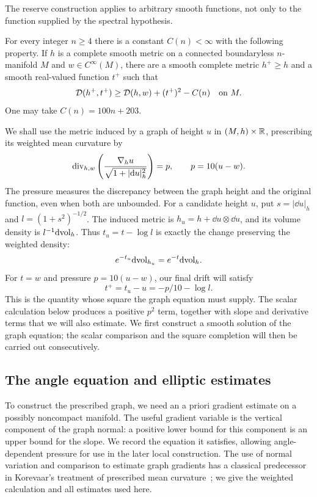The reserve construction applies to arbitrary smooth functions, not
only to the function supplied by the spectral hypothesis.

\begin{proposition}\label{pre:reserve}
For every integer $n\ge4$ there is a constant $C(n)<\infty$ with the
following property. If $h$ is a complete smooth metric on a connected
boundaryless $n$-manifold $M$ and $w\in C^\infty(M)$, there are a smooth
complete metric $h^+\ge h$ and a smooth real-valued function $t^+$ such that
\begin{equation}\label{pre:reserve-bound}
 \mathcal D(h^+,t^+)\ge \mathcal D(h,w)+(t^+)^2-C(n)
 \quad\hbox{on }M.
\end{equation}
One may take $C(n)=100n+203$.
\end{proposition}

We shall use the metric induced by a graph of height $u$ in
$(M,h)\times\mathbb R$, prescribing its weighted mean curvature by
\[
 \operatorname{div}_{h,w}\left(\frac{\nabla_hu}{\sqrt{1+|\mathrm d u|_h^2}}\right)
     =p,\qquad p=10(u-w).
\]
The pressure measures the discrepancy between the graph height and the
original function, even when both are unbounded.
For a candidate height $u$, put $s=|\dd u|_h$ and
$l=(1+s^2)^{-1/2}$. The induced metric is $h_u=h+\dd u\otimes\dd u$,
and its volume density is $l^{-1}\mathrm d\mathrm{vol}_h$. Thus $t_u=t-\log l$ is
exactly the change preserving the weighted density:
\[
 e^{-t_u}\mathrm d\mathrm{vol}_{h_u}=e^{-t}\mathrm d\mathrm{vol}_h.
\]
For $t=w$ and pressure $p=10(u-w)$, our final drift will satisfy
\[
 t^+=t_u-u=-p/10-\log l.
\]
This is the quantity whose square the graph equation must supply.
The scalar calculation below produces a positive $p^2$ term, together
with slope and derivative terms that we will also estimate. We first
construct a smooth solution of the graph equation; the scalar comparison
and the square completion will then be carried out consecutively.

\subsection{The angle equation and elliptic estimates}
\label{pre:elliptic-tools}

To construct the prescribed graph, we need an a priori gradient estimate
on a possibly noncompact manifold. The useful
gradient variable is the vertical component of the graph normal: a
positive lower bound for this component is an upper bound for the slope.
We record the equation it satisfies, allowing angle-dependent pressure
for use in the later local construction. The use of normal variation
and comparison to estimate graph gradients has a classical predecessor
in Korevaar's treatment of prescribed mean curvature~\cite{Korevaar1984};
we give the weighted calculation and all estimates used here.

